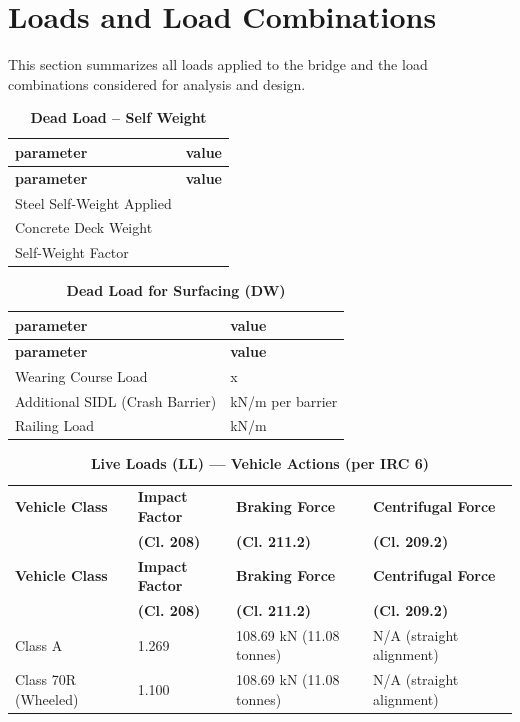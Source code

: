 
\chapter{Loads and Load Combinations}

This section summarizes all loads applied to the bridge and the load combinations considered for analysis and design.

\vspace{1em}
\begin{longtable}{|L{5.5cm}|p{10.0cm}|}
\caption{\textbf{Dead Load -- Self Weight}}
\hline
\textbf{parameter} & \textbf{value} \\
\hline
\endfirsthead

\hline
\textbf{parameter} & \textbf{value} \\
\hline
\endhead
\textnormal{Steel Self-Weight Applied} &  \\[6pt]
\hline
\textnormal{Concrete Deck Weight} &  \\[6pt]
\hline
\textnormal{Self-Weight Factor} &  \\[6pt]
\hline
\end{longtable}

\vspace{1em}
\begin{longtable}{|L{5.5cm}|p{10.0cm}|}
\caption{\textbf{Dead Load for Surfacing (DW)}}
\hline
\textbf{parameter} & \textbf{value} \\
\hline
\endfirsthead

\hline
\textbf{parameter} & \textbf{value} \\
\hline
\endhead
\textnormal{Wearing Course Load} &  x  \\[6pt]
\hline
\textnormal{Additional SIDL (Crash Barrier)} &  kN/m per barrier \\[6pt]
\hline
\textnormal{Railing Load} &  kN/m\sdstar{} \\[6pt]
\hline
\end{longtable}

\vspace{1em}
\begin{longtable}{|L{4.2cm}|C{2.6cm}|C{4.3cm}|C{4.4cm}|}
\caption{\textbf{Live Loads (LL) --- Vehicle Actions (per IRC 6)}}
\hline
\textbf{Vehicle Class} & \textbf{Impact Factor} & \textbf{Braking Force} & \textbf{Centrifugal Force} \\
 & \textbf{(Cl. 208)} & \textbf{(Cl. 211.2)} & \textbf{(Cl. 209.2)} \\
\hline
\endfirsthead

\hline
\textbf{Vehicle Class} & \textbf{Impact Factor} & \textbf{Braking Force} & \textbf{Centrifugal Force} \\
 & \textbf{(Cl. 208)} & \textbf{(Cl. 211.2)} & \textbf{(Cl. 209.2)} \\
\hline
\endhead
Class A & 1.269 & 108.69 kN (11.08 tonnes) & N/A (straight alignment) \\[6pt]
\hline
Class 70R (Wheeled) & 1.100 & 108.69 kN (11.08 tonnes) & N/A (straight alignment) \\[6pt]
\hline

\end{longtable}

